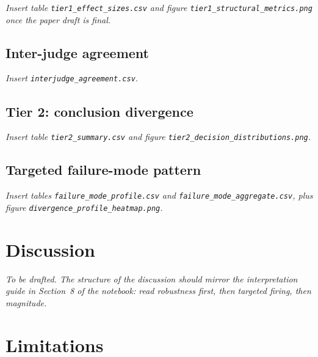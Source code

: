 \documentclass[11pt]{article}
\begin{document}
\textit{Insert table \texttt{tier1\_effect\_sizes.csv} and figure
\texttt{tier1\_structural\_metrics.png} once the paper draft is final.}

\subsection{Inter-judge agreement}

\textit{Insert \texttt{interjudge\_agreement.csv}.}

\subsection{Tier 2: conclusion divergence}

\textit{Insert table \texttt{tier2\_summary.csv} and figure
\texttt{tier2\_decision\_distributions.png}.}

\subsection{Targeted failure-mode pattern}

\textit{Insert tables \texttt{failure\_mode\_profile.csv} and
\texttt{failure\_mode\_aggregate.csv}, plus figure
\texttt{divergence\_profile\_heatmap.png}.}

\section{Discussion}

\textit{To be drafted. The structure of the discussion should mirror the
interpretation guide in Section~8 of the notebook: read robustness first,
then targeted firing, then magnitude.}

\section{Limitations}
\end{document}
